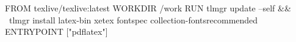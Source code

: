 FROM texlive/texlive:latest
WORKDIR /work
RUN tlmgr update --self && \
    tlmgr install latex-bin xetex fontspec collection-fontsrecommended
ENTRYPOINT ["pdflatex"]